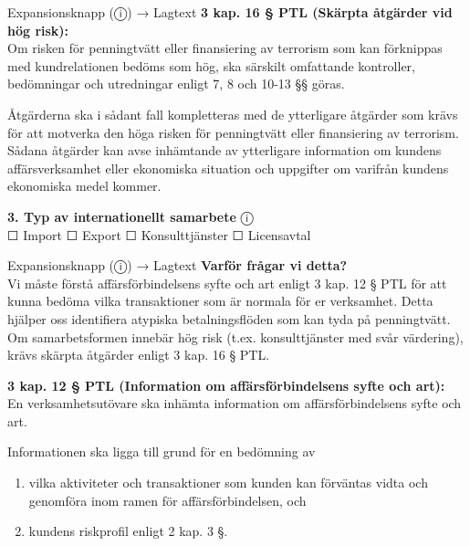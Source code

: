 \documentclass[10pt]{beamer}
\begin{document}
\begin{frame}[label=riskfragor-steg2]
\begin{alertblock}{Expansionsknapp (ⓘ) → Lagtext}
    \tiny \textbf{3 kap. 16 § PTL (Skärpta åtgärder vid hög risk):}\\
    \tiny Om risken för penningtvätt eller finansiering av terrorism som kan förknippas med kundrelationen 
    bedöms som hög, ska särskilt omfattande kontroller, bedömningar och utredningar enligt 7, 8 och 10-13 §§ 
    göras.
    
    \tiny Åtgärderna ska i sådant fall kompletteras med de ytterligare åtgärder som krävs för att motverka 
    den höga risken för penningtvätt eller finansiering av terrorism. Sådana åtgärder kan avse inhämtande 
    av ytterligare information om kundens affärsverksamhet eller ekonomiska situation och uppgifter om 
    varifrån kundens ekonomiska medel kommer.\\[0.1cm]
  \end{alertblock}

  \vspace{0.2cm}

  \textbf{3. Typ av internationellt samarbete} \hspace{0.3cm} ⓘ\\
  \tiny ☐ Import \hspace{0.5cm} ☐ Export \hspace{0.5cm} ☐ Konsulttjänster \hspace{0.5cm} ☐ Licensavtal
  \begin{alertblock}{Expansionsknapp (ⓘ) → Lagtext}
    \tiny \textbf{Varför frågar vi detta?}\\
    \tiny Vi måste förstå affärsförbindelsens syfte och art enligt 3 kap. 12 § PTL för att kunna bedöma 
    vilka transaktioner som är normala för er verksamhet. Detta hjälper oss identifiera atypiska 
    betalningsflöden som kan tyda på penningtvätt. Om samarbetsformen innebär hög risk (t.ex. konsulttjänster 
    med svår värdering), krävs skärpta åtgärder enligt 3 kap. 16 § PTL.
    
    \vspace{0.1cm}
    \tiny \textbf{3 kap. 12 § PTL (Information om affärsförbindelsens syfte och art):}\\
    \tiny En verksamhetsutövare ska inhämta information om affärsförbindelsens syfte och art.
    
    \tiny Informationen ska ligga till grund för en bedömning av
    \begin{enumerate}
      \item vilka aktiviteter och transaktioner som kunden kan förväntas vidta och genomföra inom ramen 
      för affärsförbindelsen, och
      \item kundens riskprofil enligt 2 kap. 3 §.
    \end{enumerate}
    \vspace{0.1cm}
    

\end{alertblock}
\end{frame}
\end{document}
